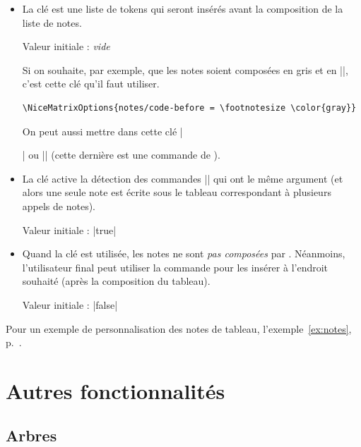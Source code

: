 \documentclass[dvipsnames]{article}
\begin{document}
\begin{itemize}[itemsep=\medskipamount,beginpenalty=10000]
Initialement, le style de liste utilisé est défini par :\quad 

|afterlabel = \nobreak, itemjoin = \quad|


\item La clé  est une liste de tokens qui seront
insérés avant la composition de la liste de notes.

Valeur initiale : \textsl{vide}

Si on souhaite, par exemple, que les notes soient composées en gris et en
|\footnotesize|, c'est cette clé qu'il faut utiliser.
\begin{Verbatim}
\NiceMatrixOptions{notes/code-before = \footnotesize \color{gray}}
\end{Verbatim}
On peut aussi mettre dans cette clé |\raggedright| ou |\RaggedRight| (cette
dernière est une commande de ).

\item La clé  active la détection des
commandes |\tabularnote| qui ont le même argument (et alors une seule note est écrite sous le
tableau correspondant à plusieurs appels de notes).

Valeur initiale : |true|


\item {}
Quand la clé  est utilisée, les notes ne sont
\emph{pas composées} par . Néanmoins, l'utilisateur final peut
utiliser la commande  pour les insérer à
l'endroit souhaité (après la composition du tableau).

Valeur initiale : |false|
\end{itemize}



\medskip
Pour un exemple de personnalisation des notes de tableau, l'exemple~\ref{ex:notes},
p.~\pageref{ex:notes}.



\section{Autres fonctionnalités}


\subsection{Arbres}
\end{document}
